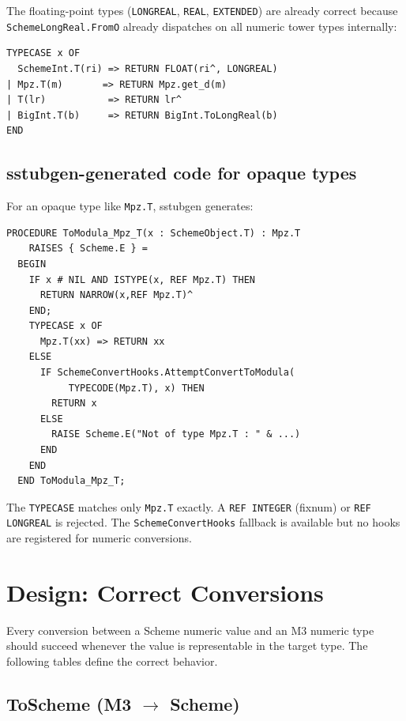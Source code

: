\documentclass[11pt]{article}
\begin{document}
The floating-point types (\texttt{LONGREAL}, \texttt{REAL},
\texttt{EXTENDED}) are already correct because
\texttt{SchemeLongReal.FromO} already dispatches on all numeric tower
types internally:
\begin{lstlisting}
TYPECASE x OF
  SchemeInt.T(ri) => RETURN FLOAT(ri^, LONGREAL)
| Mpz.T(m)       => RETURN Mpz.get_d(m)
| T(lr)           => RETURN lr^
| BigInt.T(b)     => RETURN BigInt.ToLongReal(b)
END
\end{lstlisting}

\subsection{sstubgen-generated code for opaque types}

For an opaque type like \texttt{Mpz.T}, sstubgen generates:

\begin{lstlisting}
PROCEDURE ToModula_Mpz_T(x : SchemeObject.T) : Mpz.T
    RAISES { Scheme.E } =
  BEGIN
    IF x # NIL AND ISTYPE(x, REF Mpz.T) THEN
      RETURN NARROW(x,REF Mpz.T)^
    END;
    TYPECASE x OF
      Mpz.T(xx) => RETURN xx
    ELSE
      IF SchemeConvertHooks.AttemptConvertToModula(
           TYPECODE(Mpz.T), x) THEN
        RETURN x
      ELSE
        RAISE Scheme.E("Not of type Mpz.T : " & ...)
      END
    END
  END ToModula_Mpz_T;
\end{lstlisting}

The \texttt{TYPECASE} matches only \texttt{Mpz.T} exactly.  A
\texttt{REF INTEGER} (fixnum) or \texttt{REF LONGREAL} is rejected.
The \texttt{SchemeConvertHooks} fallback is available but no hooks are
registered for numeric conversions.

\section{Design: Correct Conversions}

Every conversion between a Scheme numeric value and an M3 numeric type
should succeed whenever the value is representable in the target type.
The following tables define the correct behavior.

\subsection{ToScheme (M3 $\to$ Scheme)}
\end{document}
